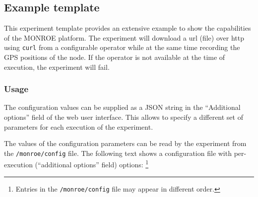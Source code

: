 \documentclass[a4paper,10pt]{article}
\newcommand{\monroe}{MONROE}
\newcommand{\identifier}[1]{{\texttt{\small{#1}}}}
\begin{document}
\subsection{Example template}
\label{subsec:exampleTemplate}

This experiment template provides an extensive example to show the capabilities of the \monroe{} platform.
The experiment will download a url (file) over http using \identifier{curl} from a configurable operator while at the same time recording the GPS positions of the node.
If the operator is not available at the time of execution, the experiment will fail.

\subsubsection{Usage}
\label{subsubsec:templateUsage}


The configuration values can be supplied as a JSON string in the ``Additional options'' field of the web user interface.
This allows to specify a different set of parameters for each execution of the experiment.

The values of the configuration parameters can be read by the experiment from the \identifier{/monroe/config} file.
The following text shows a configuration file with %
per-execution (``additional options'' field) options:%
\footnote{Entries in the \identifier{/monroe/config} file may appear in different order.}
\end{document}

